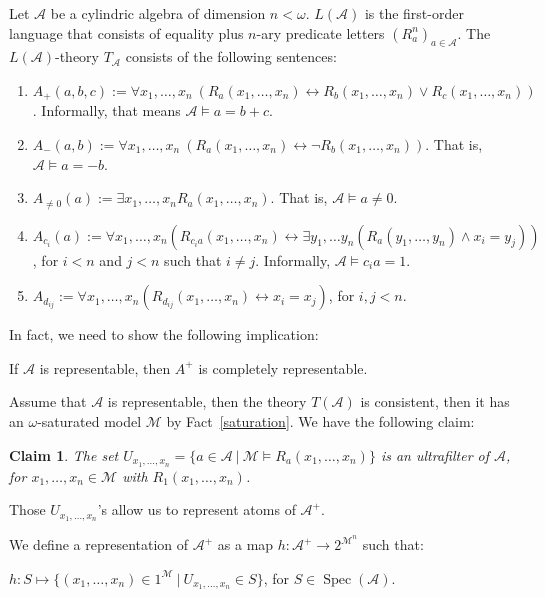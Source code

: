 \documentclass[a4paper]{article}
\theoremstyle{defin}
\theoremstyle{theorem}
\theoremstyle{claim}
\newtheorem{claim}{Claim}
\theoremstyle{prop}
\theoremstyle{lemma}
\theoremstyle{fact}
\theoremstyle{ex}
\theoremstyle{col}
\begin{document}
\begin{defin} \label{theory} Let $\mathcal{A}$ be a cylindric algebra of dimension $n < \omega$.
$L(\mathcal{A})$ is the first-order language that consists of equality plus $n$-ary predicate letters $(R^n_a)_{a \in \mathcal{A}}$. The $L(\mathcal{A})$-theory $T_{\mathcal{A}}$ consists of the following sentences:
\begin{enumerate}
\item $A_+(a,b,c) := \forall x_1, \dots, x_n \: (R_a(x_1, \dots, x_n) \leftrightarrow R_b(x_1, \dots, x_n) \lor R_c(x_1, \dots, x_n))$. Informally, that means $\mathcal{A} \models a = b + c$.
\item $A_{-}(a,b) := \forall x_1, \dots, x_n \: (R_a(x_1, \dots, x_n) \leftrightarrow \neg R_b(x_1, \dots, x_n))$. That is, $\mathcal{A} \models a = - b$.
\item $A_{\neq 0}(a) := \exists x_1, \dots, x_n R_a(x_1, \dots, x_n)$. That is, $\mathcal{A} \models a \neq 0$.
\item $A_{c_i}(a) := \forall x_1, \dots, x_n (R_{c_i a}(x_1, \dots, x_n) \leftrightarrow \exists y_1, \dots y_n (R_a(y_1, \dots, y_n) \land x_i = y_j))$, for $i < n$ and $j < n$ such that $i \neq j$. Informally, $\mathcal{A} \models {c_i} a = 1$.
\item $A_{d_{ij}} := \forall x_1, \dots, x_n (R_{d_{ij}}(x_1, \dots, x_n) \leftrightarrow x_i = x_j)$, for $i, j < n$.
\end{enumerate}
\end{defin}

In fact, we need to show the following implication:
\begin{center}
If $\mathcal{A}$ is representable, then $A^{+}$ is completely representable.
\end{center}

Assume that $\mathcal{A}$ is representable, then the theory $T(\mathcal{A})$ is consistent, then it has an $\omega$-saturated model $\mathcal{M}$ by Fact~\ref{saturation}. We have the following claim:
\begin{claim}
The set $U_{x_1,\dots,x_n} = \{ a \in \mathcal{A} \: | \: \mathcal{M} \models R_a(x_1,\dots,x_n)\}$ is an ultrafilter of $\mathcal{A}$, for $x_1,\dots,x_n \in \mathcal{M}$ with $R_{1}(x_1,\dots,x_n)$.
\end{claim}
Those $U_{x_1,\dots,x_n}$'s allow us to represent atoms of $\mathcal{A}^{+}$.

We define a representation of $\mathcal{A}^{+}$ as a map $h : \mathcal{A}^{+} \to 2^{\mathcal{M}^n}$ such that:
\begin{center}
$h : S \mapsto \{ (x_1, \dots, x_n) \in 1^{\mathcal{M}} \: | \: U_{x_1,\dots,x_n} \in S \}$, for $S \in \operatorname{Spec}(\mathcal{A})$.
\end{center}
\end{document}
